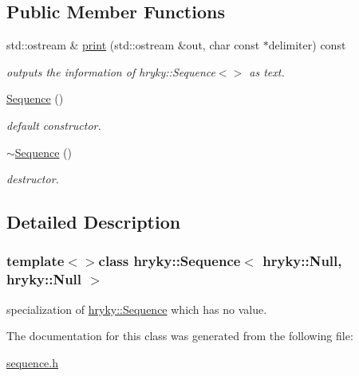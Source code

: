 \subsection*{Public Member Functions}
\begin{DoxyCompactItemize}
\item 
\hypertarget{classhryky_1_1_sequence_3_01hryky_1_1_null_00_01hryky_1_1_null_01_4_a418fe8226cd08488f37dfd780d99a069}{std\-::ostream \& \hyperlink{classhryky_1_1_sequence_3_01hryky_1_1_null_00_01hryky_1_1_null_01_4_a418fe8226cd08488f37dfd780d99a069}{print} (std\-::ostream \&out, char const $\ast$delimiter) const }\label{classhryky_1_1_sequence_3_01hryky_1_1_null_00_01hryky_1_1_null_01_4_a418fe8226cd08488f37dfd780d99a069}

\begin{DoxyCompactList}\small\item\em outputs the information of hryky\-::\-Sequence$<$$>$ as text. \end{DoxyCompactList}\item 
\hypertarget{classhryky_1_1_sequence_3_01hryky_1_1_null_00_01hryky_1_1_null_01_4_a2fffbf28d512e8908cf45420925965da}{\hyperlink{classhryky_1_1_sequence_3_01hryky_1_1_null_00_01hryky_1_1_null_01_4_a2fffbf28d512e8908cf45420925965da}{Sequence} ()}\label{classhryky_1_1_sequence_3_01hryky_1_1_null_00_01hryky_1_1_null_01_4_a2fffbf28d512e8908cf45420925965da}

\begin{DoxyCompactList}\small\item\em default constructor. \end{DoxyCompactList}\item 
\hypertarget{classhryky_1_1_sequence_3_01hryky_1_1_null_00_01hryky_1_1_null_01_4_a38b99780ac2d691209e002b8cc550bf4}{\hyperlink{classhryky_1_1_sequence_3_01hryky_1_1_null_00_01hryky_1_1_null_01_4_a38b99780ac2d691209e002b8cc550bf4}{$\sim$\-Sequence} ()}\label{classhryky_1_1_sequence_3_01hryky_1_1_null_00_01hryky_1_1_null_01_4_a38b99780ac2d691209e002b8cc550bf4}

\begin{DoxyCompactList}\small\item\em destructor. \end{DoxyCompactList}\end{DoxyCompactItemize}


\subsection{Detailed Description}
\subsubsection*{template$<$$>$class hryky\-::\-Sequence$<$ hryky\-::\-Null, hryky\-::\-Null $>$}

specialization of \hyperlink{classhryky_1_1_sequence}{hryky\-::\-Sequence} which has no value. 

The documentation for this class was generated from the following file\-:\begin{DoxyCompactItemize}
\item 
\hyperlink{sequence_8h}{sequence.\-h}\end{DoxyCompactItemize}
